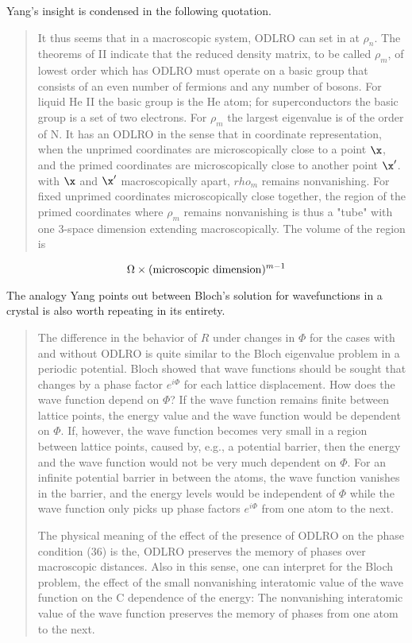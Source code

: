 Yang's insight is condensed in the following quotation.
%
\begin{quote}
It thus seems that in a macroscopic system, ODLRO can set in 
at $\rho_{n}$. The theorems of II indicate that
the reduced density matrix, to be called $\rho_{m}$, of lowest
order which has ODLRO must operate on a basic group that consists 
of an even number of fermions and any number of bosons. For liquid He II the basic
group is the He atom; for superconductors the basic group is a set of two electrons.
For $\rho_{m}$ the largest eigenvalue is of the order of N. It has an ODLRO
in the sense that in coordinate representation, when the unprimed coordinates are
microscopically close to a point $\x$, and the primed coordinates are microscopically
close to another point $\x'$. with $\x$ and $\x'$ macroscopically apart, $rho_{m}$
remains nonvanishing. For fixed unprimed coordinates microscopically
close together, the region of the primed coordinates where
$\rho_{m}$ remains nonvanishing is thus a "tube" with one 3-space dimension 
extending macroscopically. The volume of the region is 
\end{quote}
\begin{equation}
\Omega \times ({\rm microscopic\ dimension})^{m-1}
\end{equation}
%

The analogy Yang points out between Bloch's solution for wavefunctions 
in a crystal is also worth repeating in its entirety.

\begin{quote}
  The difference in the behavior of $R$ under changes in $\Phi$ for the cases 
with and without ODLRO is quite similar to the Bloch eigenvalue problem
in a periodic potential. Bloch showed that wave functions should be sought 
that changes by a phase factor $e^{i\Phi}$ for each lattice displacement. How does the 
wave function depend on $\Phi$? If the wave function remains finite between lattice points, 
the energy value and the wave function would be dependent on $\Phi$. If, however, 
the wave function becomes very small in a region between lattice points, 
caused by, e.g., a potential barrier, then the energy and the wave function 
would not be very much dependent on $\Phi$. For an infinite potential barrier in 
between the atoms, the wave function vanishes in the barrier, and the energy 
levels would be independent of $\Phi$ while the
wave function only picks up phase factors $e^{i\Phi}$ from one atom to the next.

The physical meaning of the effect of the presence of ODLRO on the 
phase condition (36) is the, ODLRO preserves the memory of phases over 
macroscopic distances. Also in this sense, one can interpret for the 
Bloch problem, the effect of the small nonvanishing interatomic 
value of the wave function on the C dependence of the energy: 
The nonvanishing interatomic value of the wave function preserves the 
memory of phases from one atom to the next.
\end{quote}

